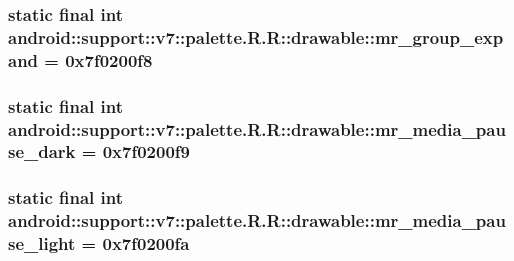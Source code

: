 \hypertarget{classandroid_1_1support_1_1v7_1_1palette_1_1_r_1_1drawable_c267d185c3f03bb6a1b9def1c790c264}{
\subsubsection[{mr\_\-group\_\-expand}]{\setlength{\rightskip}{0pt plus 5cm}static final int android::support::v7::palette.R.R::drawable::mr\_\-group\_\-expand = 0x7f0200f8}}
\label{classandroid_1_1support_1_1v7_1_1palette_1_1_r_1_1drawable_c267d185c3f03bb6a1b9def1c790c264}


\hypertarget{classandroid_1_1support_1_1v7_1_1palette_1_1_r_1_1drawable_b3c1f2a782ef2e7d6cf7ee95215bcc8a}{
\subsubsection[{mr\_\-media\_\-pause\_\-dark}]{\setlength{\rightskip}{0pt plus 5cm}static final int android::support::v7::palette.R.R::drawable::mr\_\-media\_\-pause\_\-dark = 0x7f0200f9}}
\label{classandroid_1_1support_1_1v7_1_1palette_1_1_r_1_1drawable_b3c1f2a782ef2e7d6cf7ee95215bcc8a}


\hypertarget{classandroid_1_1support_1_1v7_1_1palette_1_1_r_1_1drawable_179e7e804782cc0c6e42c730f4e760c6}{
\subsubsection[{mr\_\-media\_\-pause\_\-light}]{\setlength{\rightskip}{0pt plus 5cm}static final int android::support::v7::palette.R.R::drawable::mr\_\-media\_\-pause\_\-light = 0x7f0200fa}}
\label{classandroid_1_1support_1_1v7_1_1palette_1_1_r_1_1drawable_179e7e804782cc0c6e42c730f4e760c6}


